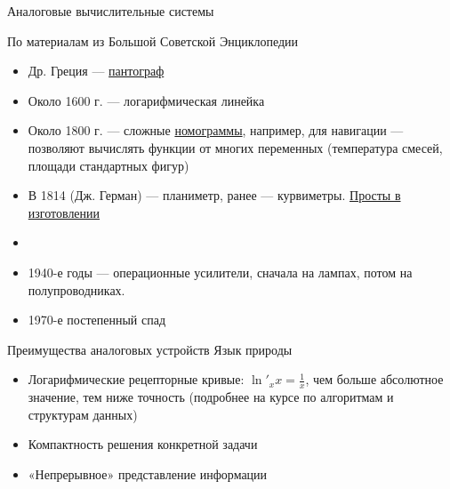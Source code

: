 \documentclass[xetex,aspectratio=43]{beamer}
\begin{document}
\begin{frame}{Аналоговые вычислительные системы}
	
	\pause
	
	По материалам из Большой Советской Энциклопедии
	
	\begin{itemize}
		
		\item
		Др. Греция ---
		\href{https://ru.wikipedia.org/wiki/\%D0\%9F\%D0\%B0\%D0\%BD\%D1\%82\%D0\%BE\%D0\%B3\%D1\%80\%D0\%B0\%D1\%84_(\%D0\%BF\%D1\%80\%D0\%B8\%D0\%B1\%D0\%BE\%D1\%80)\#\%D0\%98\%D0\%B7\%D0\%BE\%D0\%B1\%D1\%80\%D0\%B0\%D0\%B6\%D0\%B5\%D0\%BD\%D0\%B8\%D1\%8F}{пантограф}
		\item
		Около 1600 г. --- логарифмическая линейка
		\item
		Около 1800 г. --- сложные
		\href{https://en.wikipedia.org/wiki/Nomogram}{номограммы}, например,
		для навигации --- позволяют вычислять функции от многих переменных
		(температура смесей, площади стандартных фигур)
		\item
		В 1814 (Дж. Герман) --- планиметр, ранее --- курвиметры.
		\href{https://youtu.be/kwSN7edZZnM}{Просты в изготовлении}
		\item 
		\item
		1940-е годы --- операционные усилители, сначала на лампах, потом на
		полупроводниках.
		\item
		1970-е постепенный спад
	\end{itemize}
\end{frame}

\begin{frame}{Преимущества аналоговых устройств}
	Язык природы
	
	\begin{itemize}
		
		\item
		Логарифмические рецепторные кривые: \(\ln'_{x}x = \frac{1}{x}\), чем
		больше абсолютное значение, тем ниже точность (подробнее на курсе по
		алгоритмам и структурам данных)
		\item
		Компактность решения конкретной задачи
		\item
		«Непрерывное» представление информации
	\end{itemize}
	
\end{frame}
\end{document}

